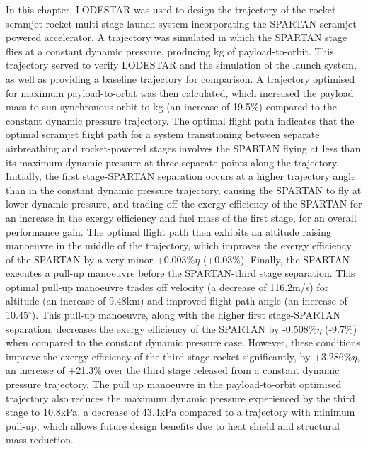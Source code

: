 In this chapter, LODESTAR was used to design the trajectory of the rocket-scramjet-rocket multi-stage launch system incorporating the SPARTAN scramjet-powered accelerator. 
A trajectory was simulated in which the SPARTAN stage flies at a constant dynamic pressure, producing \PayloadToOrbitConstqNoReturn kg of payload-to-orbit. This trajectory served to verify LODESTAR and the simulation of  the launch system, as well as providing a baseline trajectory for comparison. 
A trajectory optimised for maximum payload-to-orbit was then calculated, which increased the payload mass to sun synchronous orbit to \PayloadToOrbitStandardNoReturn kg (an increase of 19.5\%) compared to the constant dynamic pressure trajectory.
  The optimal flight path indicates that the optimal scramjet flight path for a system transitioning between separate airbreathing and rocket-powered stages involves the SPARTAN flying at less than its maximum dynamic pressure at three separate points along the trajectory. 
  Initially, the first stage-SPARTAN separation occurs at a higher trajectory angle than in the constant dynamic pressure trajectory, causing the SPARTAN to fly at lower dynamic pressure, and trading off the exergy efficiency of the SPARTAN for an increase in the exergy efficiency and fuel mass of the first stage, for an overall performance gain. 
  The optimal flight path then exhibits an altitude raising manoeuvre in the middle of the trajectory, which improves the exergy efficiency of the SPARTAN by a very minor +0.003\%$\eta$ (+0.03\%). 
  Finally, the SPARTAN executes a pull-up manoeuvre before the SPARTAN-third stage separation. This optimal pull-up manoeuvre trades off velocity (a decrease of 116.2m/s) for altitude (an increase of 9.48km) and improved flight path angle (an increase of 10.45$^\circ$). This pull-up manoeuvre, along with the higher first stage-SPARTAN separation, decreases the exergy efficiency of the SPARTAN by -0.508\%$\eta$ (-9.7\%) when compared to the constant dynamic pressure case. 
  However, these conditions improve the exergy efficiency of the third stage rocket significantly, by +3.286\%$\eta$, an increase of +21.3\% over the third stage released from a constant dynamic pressure trajectory. 
 The pull up manoeuvre in the payload-to-orbit optimised trajectory also reduces the maximum dynamic pressure experienced by the third stage to 10.8kPa, a decrease of 43.4kPa compared to a trajectory with minimum pull-up, which allows future design benefits due to heat shield and structural mass reduction.  

